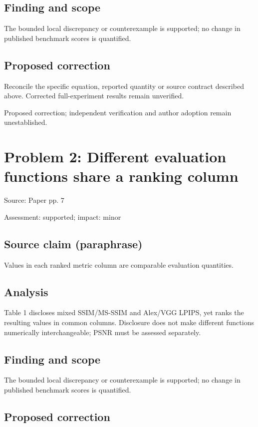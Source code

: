 \documentclass[11pt]{article}
\begin{document}
\subsection*{Finding and scope}

The bounded local discrepancy or counterexample is supported; no change in published benchmark scores is quantified.

\subsection*{Proposed correction}

Reconcile the specific equation, reported quantity or source contract described above. Corrected full-experiment results remain unverified.

Proposed correction; independent verification and author adoption remain unestablished.

\section*{Problem 2: Different evaluation functions share a ranking column}

Source: Paper pp. 7

Assessment: supported; impact: minor

\subsection*{Source claim (paraphrase)}

Values in each ranked metric column are comparable evaluation quantities.

\subsection*{Analysis}

Table 1 discloses mixed SSIM/MS-SSIM and Alex/VGG LPIPS, yet ranks the resulting values in common columns. Disclosure does not make different functions numerically interchangeable; PSNR must be assessed separately.

\subsection*{Finding and scope}

The bounded local discrepancy or counterexample is supported; no change in published benchmark scores is quantified.

\subsection*{Proposed correction}
\end{document}
